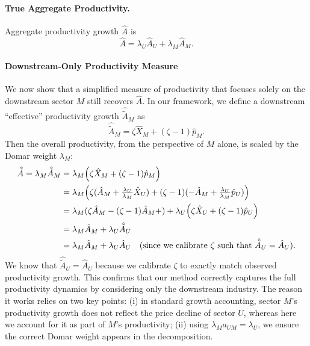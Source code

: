 \documentclass[11pt]{article}
\begin{document}
\paragraph{True Aggregate Productivity.}
Aggregate productivity growth $\hat{A}$ is 
\begin{equation}
      \hat{A} 
     =  
    \lambda_U  \hat{A}_U  +  \lambda_M  \hat{A}_M.
\end{equation}


\paragraph{Downstream-Only Productivity Measure} We now show that a simplified measure of productivity that focuses solely on the downstream sector $M$ still recovers $\hat{A}$. In our framework, we define a downstream ``effective'' productivity growth $\hat{\tilde{A}}_M$ as
\begin{equation*}
    \hat{\tilde{A}}_M =  \zeta \hat{X}_M + (\zeta - 1) \hat{p}_M.
\end{equation*}
Then the overall productivity, from the perspective of $M$ alone, is scaled by the Domar weight $\lambda_M$:
\begin{equation}
    \begin{aligned}
    \hat{\tilde{A}}=\lambda_M  \hat{\tilde{A}}_M 
    &= \lambda_M\Bigl(\zeta \hat{X}_M + (\zeta-1) \hat{p}_M\Bigr)\\
    &= \lambda_M\Bigl(\zeta(\hat{A}_M+ \tfrac{\lambda_U}{\lambda_M} \hat{X}_U )
        +  (\zeta-1) (-\hat{A}_M+\tfrac{\lambda_U}{\lambda_M} \hat{p}_U)\Bigr)\\
    &= \lambda_M (\zeta\hat{A}_M-(\zeta-1)\hat{A}_M+)+\lambda_U\Bigl(\zeta \hat{X}_U + (\zeta-1) \hat{p}_U\Bigr)\\
    &= \lambda_M \hat{A}_M+\lambda_U \hat{\tilde{A}}_U\\
    &=\lambda_M \hat{A}_M+\lambda_U \hat{A}_U\quad(\text{since we calibrate }\zeta\text{ such that }\hat{\tilde{A}}_U=\hat{A}_U).
\end{aligned}
\end{equation}
We know that $\hat{\tilde{A}}_U = \hat{A}_U$ because we calibrate $\zeta$ to exactly match observed productivity growth.
This confirms that our method correctly captures the full productivity dynamics by considering only the downstream industry. The reason it works relies on two key points: (i) in standard growth accounting, sector $M$'s productivity growth does not reflect the price decline of sector $U$, whereas here we account for it as part of $M$'s productivity; (ii) using $\lambda_M a_{UM} = \lambda_U$, we ensure the correct Domar weight appears in the decomposition. 
\end{document}
